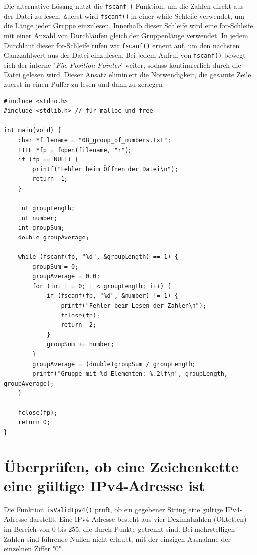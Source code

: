 Die alternative Lösung nutzt die \texttt{fscanf()}-Funktion, um die
Zahlen direkt aus der Datei zu lesen. Zuerst wird \texttt{fscanf()} in
einer while-Schleife verwendet, um die Länge jeder Gruppe einzulesen. Innerhalb
dieser Schleife wird eine for-Schleife mit einer Anzahl von Durchläufen gleich
der Gruppenlänge verwendet. In jedem Durchlauf dieser for-Schleife rufen wir
\texttt{fscanf()} erneut auf, um den nächsten Ganzzahlwert aus der Datei
einzulesen. Bei jedem Aufruf von \texttt{fscanf()} bewegt sich der
interne "\textit{File Position Pointer}" weiter, sodass kontinuierlich durch die
Datei gelesen wird. Dieser Ansatz eliminiert die Notwendigkeit, die gesamte
Zeile zuerst in einen Puffer zu lesen und dann zu zerlegen

\begin{verbatim}
#include <stdio.h>
#include <stdlib.h> // für malloc und free

int main(void) {
    char *filename = "08_group_of_numbers.txt";
    FILE *fp = fopen(filename, "r");
    if (fp == NULL) {
        printf("Fehler beim Öffnen der Datei\n");
        return -1;
    }

    int groupLength;
    int number;
    int groupSum;
    double groupAverage;

    while (fscanf(fp, "%d", &groupLength) == 1) {
        groupSum = 0;
        groupAverage = 0.0;
        for (int i = 0; i < groupLength; i++) {
            if (fscanf(fp, "%d", &number) != 1) {
                printf("Fehler beim Lesen der Zahlen\n");
                fclose(fp);
                return -2;
            }
            groupSum += number;
        }
        groupAverage = (double)groupSum / groupLength;
        printf("Gruppe mit %d Elementen: %.2lf\n", groupLength, groupAverage);
    }

    fclose(fp);
    return 0;
}
\end{verbatim}



\chapter{Überprüfen, ob eine Zeichenkette eine gültige IPv4-Adresse ist}

Die Funktion \texttt{isValidIpv4()} prüft, ob ein gegebener String eine
gültige IPv4-Adresse darstellt. Eine IPv4-Adresse besteht aus vier Dezimalzahlen
(Oktetten) im Bereich von 0 bis 255, die durch Punkte getrennt sind. Bei
mehrstelligen Zahlen sind führende Nullen nicht erlaubt, mit der einzigen
Ausnahme der einzelnen Ziffer "0".

